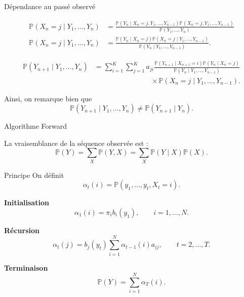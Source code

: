 \documentclass{beamer}
\begin{document}
\begin{frame}{Dépendance au passé observé}

\scriptsize

\begin{align*}
\mathbb{P}(X_n=j\mid Y_1,\dots,Y_n)
&=
\frac{
\mathbb{P}(Y_n\mid X_n=j,Y_1,\dots,Y_{n-1})
\mathbb{P}(X_n=j,Y_1,\dots,Y_{n-1})
}{
\mathbb{P}(Y_1,\dots,Y_n)
}
\\[0.45cm]
\mathbb{P}(X_n=j\mid Y_1,\dots,Y_n)
&=
\frac{
\mathbb{P}(Y_n\mid X_n=j)
\mathbb{P}(X_n=j\mid Y_1,\dots,Y_{n-1})
}{
\mathbb{P}(Y_n\mid Y_1,\dots,Y_{n-1})
}.
\end{align*}

\vspace{0.25cm}

\[
\begin{aligned}
\mathbb{P}(Y_{n+1}\mid Y_1,\dots,Y_n)
&=
\sum_{i=1}^{K}\sum_{j=1}^{K}
a_{ji}
\frac{
\mathbb{P}(Y_{n+1}\mid X_{n+1}=i)
\mathbb{P}(Y_n\mid X_n=j)
}{
\mathbb{P}(Y_n\mid Y_1,\dots,Y_{n-1})
}
\\[0.2cm]
&\qquad\qquad\qquad\qquad\times
\mathbb{P}(X_n=j\mid Y_1,\dots,Y_{n-1}).
\end{aligned}
\]

\vspace{0.25cm}
Ainsi, on remarque bien que 
\[
\mathbb{P}(Y_{n+1}\mid Y_1,\dots,Y_n)
\neq
\mathbb{P}(Y_{n+1}\mid Y_n).
\]

\end{frame}

\begin{frame}{Algorithme Forward}

\small

La vraisemblance de la séquence observée est :
\[
\mathbb{P}(Y)
=
\sum_X \mathbb{P}(Y,X)
=
\sum_X \mathbb{P}(Y\mid X)\mathbb{P}(X).
\]

\vspace{0.25cm}

\begin{block}{Principe}
On définit
\[
\alpha_t(i)=\mathbb{P}(y_1,\dots,y_t,X_t=i).
\]


\vspace{0.15cm}

\textbf{Initialisation}
\[
\alpha_1(i)=\pi_i b_i(y_1),
\qquad i=1,\dots,N.
\]

\textbf{Récursion}
\[
\alpha_t(j)
=
b_j(y_t)\sum_{i=1}^{N}\alpha_{t-1}(i)a_{ij},
\qquad t=2,\dots,T.
\]

\textbf{Terminaison}
\[
\mathbb{P}(Y)=\sum_{i=1}^{N}\alpha_T(i).
\]
\end{block}

\end{frame}
\end{document}
